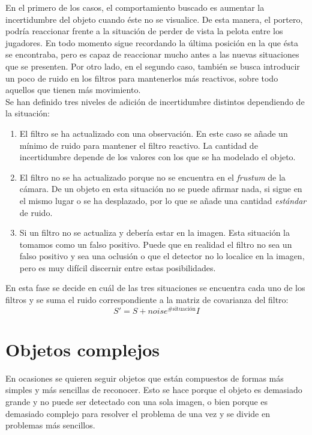 En el primero de los casos, el comportamiento buscado es aumentar la incertidumbre del objeto cuando éste no se visualice. De esta manera, el portero, podría reaccionar frente a la situación de perder de vista la pelota entre los jugadores. En todo momento sigue recordando la última posición en la que ésta se encontraba, pero es capaz de reaccionar mucho antes a las nuevas situaciones que se presenten. Por otro lado, en el segundo caso, también se busca introducir un poco de ruido en los filtros para mantenerlos más reactivos, sobre todo aquellos que tienen más movimiento. \\

Se han definido tres niveles de adición de incertidumbre distintos dependiendo de la situación:
\begin{enumerate}

\item El filtro se ha actualizado con una observación. En este caso se añade un mínimo de ruido para mantener el filtro reactivo. La cantidad de incertidumbre depende de los valores con los que se ha modelado el objeto.

\item El filtro no se ha actualizado porque no se encuentra en el \textit{frustum} de la cámara. De un objeto en esta situación no se puede afirmar nada, si sigue en el mismo lugar o se ha desplazado, por lo que se añade una cantidad \textit{estándar} de ruido.

\item Si un filtro no se actualiza y debería estar en la imagen. Esta situación la tomamos como un falso positivo. Puede que en realidad el filtro no sea un falso positivo y sea una oclusión o que el detector no lo localice en la imagen, pero es muy difícil discernir entre estas posibilidades.

\end{enumerate}

En esta fase se decide en cuál de las tres situaciones se encuentra cada uno de los filtros y se suma el ruido correspondiente a la matriz de covarianza del filtro:
\begin{equation}
  S' = S + noise^{\# \text{situación}} I
\end{equation}

\section{Objetos complejos}
\label{sec:objetoscomplejos}

En ocasiones se quieren seguir objetos que están compuestos de formas más simples y más sencillas de reconocer. Esto se hace porque el objeto es demasiado grande y no puede ser detectado con una sola imagen, o bien porque es demasiado complejo para resolver el problema de una vez y se divide en problemas más sencillos. \\


